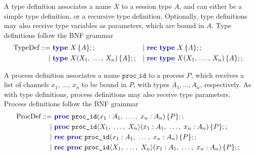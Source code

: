 A type definition associates a name $X$ to a session type $A$, and can either be a simple type definition, or a recursive type definition. Optionally, type definitions may also receive type variables as parameters, which are bound in $A$. Type definitions follow the BNF grammar
\[\begin{aligned}
    \text{TypeDef} ::=\  & \typedefc{X}{A}                     &  & |\ \rectypedefc{X}{A}                     \\
    |\                   & \typedefgc{X}{X_1,\,\dots,\,X_n}{A} &  & |\ \rectypedefgc{X}{X_1,\,\dots,\,X_n}{A} \\
\end{aligned}\]

A process definition associates a name $\texttt{proc\_id}$ to a process $P$, which receives a list of channels $x_1,\,\ldots,\,x_n$ to be bound in $P$, with types $A_1, \ldots, A_n$, respectively. As with type definitions, process definitions may also receive type parameters. Process definitions follow the BNF grammar
\[\begin{aligned}
    \text{ProcDef} ::=\  & \procdefc{proc\_id}{x_1: A_1,\ \dots,\ x_n: A_n}{P}                        \\
    |\                   & \procdefgc{proc\_id}{X_1,\ \dots,\ X_n}{x_1: A_1,\ \dots,\ x_n: A_n}{P}    \\
    |\                   & \recprocdefc{proc\_id}{x_1: A_1,\ \dots,\ x_n: A_n}{P}                     \\
    |\                   & \recprocdefgc{proc\_id}{X_1,\ \dots,\ X_n}{x_1: A_1,\ \dots,\ x_n: A_n}{P}
\end{aligned}\]

